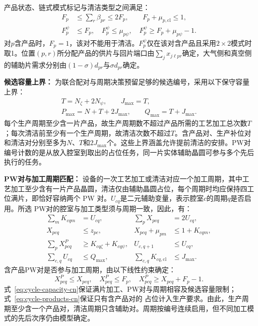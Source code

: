 \documentclass[preprint,12pt,nonatbib]{elsarticle}
\begin{document}
产品状态、链式模式标记与清洁类型之间满足：
\begin{equation}
\begin{aligned}
F_p&\le\sum_r\beta_{pr}\le2F_p,\qquad F_p+\mu_{p,\mathrm{cl}}\le1,\\
F_p^\psi&\le F_p,\quad F_p^\psi\le\mu_{p\psi},\quad
F_p^\psi\ge F_p+\mu_{p\psi}-1.
\end{aligned}
\label{eq:pair-type-cn}
\end{equation}
对$p$含产品时，$F_p=1$，该对不能用于清洁。$F_p^\psi$仅在该对含产品且采用$2\times2$模式时取1。位置$(p,r)$所分配产品的供片与回片端口由$\sum_jx_{j\ell pr}$确定，大气侧和真空侧的辅助片需求分别由$(1-\sigma)d_{pr}$与$\sigma d_{pr}$确定。

\noindent\textbf{候选容量上界：}
为联合配对与周期决策预留足够的候选编号，采用以下保守容量上界：
\begin{equation}
\begin{gathered}
T=N_{\zeta}+2N_{\psi},\qquad J_{\max}=T,\\
P_{\max}=N+T+2J_{\max},\qquad Q_{\max}=T+J_{\max}.
\end{gathered}
\label{eq:candidate-bounds-cn}
\end{equation}
每个生产周期至少含一片产品，故生产周期数不超过产品所需的工艺加工总次数$T$；每次清洁前至少有一个生产周期，故清洁次数不超过$T$。含产品对、生产补位对和清洁对分别至多为$N$、$T$和$2J_{\max}$个。这些上界涵盖允许提前清洁的安排。PW对编号计数的是从放入腔室到取出的占位任务，同一片实体辅助晶圆可参与多个先后执行的任务。

\noindent\textbf{PW对与加工周期匹配：}
设备的一次工艺加工或清洁对应一个加工周期，其中工艺加工至少含有一片产品晶圆，清洁仅由辅助晶圆占位，每个周期时均应保持四工位满片，即恰好容纳两个 PW 对。$U_{cq}$是二元辅助变量，表示腔室$c$的周期$q$是否启用。所选
PW对的腔室与加工类型须与周期一致，因此，有：
\begin{equation}
\begin{aligned}
\sum_mK_{cqm}&=U_{cq}, &\sum_pX_{pcq}&=2U_{cq},\\
X_{pcq}&\le z_{pc}, &X_{pcq}+\mu_{pm}&\le1+K_{cqm},\\
\sum_pX^P_{pcq}&\ge K_{cq\zeta}+K_{cq\psi}, &U_{c,q+1}&\le U_{cq},\\
\sum_{c,q}U_{cq}&\le Q_{\max}, &\sum_{c,q}K_{cq,\mathrm{cl}}&\le J_{\max}.
\end{aligned}
\label{eq:cycle-capacity-cn}
\end{equation}
含产品PW对是否参与加工周期，由以下线性约束确定：
\begin{equation}
X^P_{pcq}\le X_{pcq},\quad X^P_{pcq}\le F_p,\quad
X^P_{pcq}\ge X_{pcq}+F_p-1.
\label{eq:cycle-products-cn}
\end{equation}
式~\eqref{eq:cycle-capacity-cn}保证满片加工、PW对与周期相容及候选容量限制；式~\eqref{eq:cycle-products-cn}保证只有含产品对的
占位计入生产要求。由此，生产周期至少含一个产品对，清洁周期只含辅助对。周期按编号连续启用，但不同加工模式的先后次序仍由模型确定。
\end{document}
